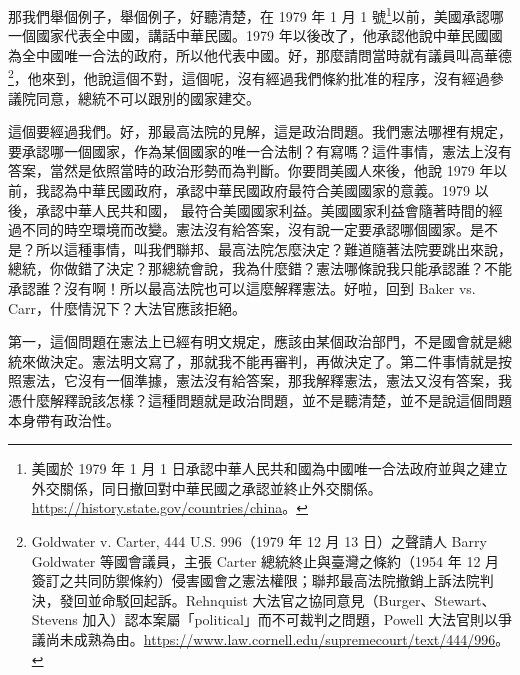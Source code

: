 \hypertarget{c08:cue:38}{}那我們舉個例子，舉個例子，好聽清楚，在 1979 年 1 月 1 號\footnote{美國於 1979 年 1 月 1 日承認中華人民共和國為中國唯一合法政府並與之建立外交關係，同日撤回對中華民國之承認並終止外交關係。\url{https://history.state.gov/countries/china}。}以前，美國承認哪一個國家代表全中國，講話中華民國。1979 年以後改了，他承認他說中華民國國為全中國唯一合法的政府，所以他代表中國。好，那麼請問當時就有議員叫高華德\footnote{Goldwater v. Carter, 444 U.S. 996（1979 年 12 月 13 日）之聲請人 Barry Goldwater 等國會議員，主張 Carter 總統終止與臺灣之條約（1954 年 12 月簽訂之共同防禦條約）侵害國會之憲法權限；聯邦最高法院撤銷上訴法院判決，發回並命駁回起訴。Rehnquist 大法官之協同意見（Burger、Stewart、Stevens 加入）認本案屬「political」而不可裁判之問題，Powell 大法官則以爭議尚未成熟為由。\url{https://www.law.cornell.edu/supremecourt/text/444/996}。}，他來到，他說這個不對，這個呢，沒有經過我們條約批准的程序，沒有經過參議院同意，總統不可以跟別的國家建交。

\hypertarget{c08:cue:39}{}這個要經過我們。好，那最高法院的見解，這是政治問題。我們憲法哪裡有規定，要承認哪一個國家，作為某個國家的唯一合法制？有寫嗎？這件事情，憲法上沒有答案，當然是依照當時的政治形勢而為判斷。你要問美國人來後，他說 1979 年以前，我認為中華民國政府，承認中華民國政府最符合美國國家的意義。1979 以後，承認中華人民共和國，
\hypertarget{c08:cue:40}{}最符合美國國家利益。美國國家利益會隨著時間的經過不同的時空環境而改變。憲法沒有給答案，沒有說一定要承認哪個國家。是不是？所以這種事情，叫我們聯邦、最高法院怎麼決定？難道隨著法院要跳出來說，總統，你做錯了決定？那總統會說，我為什麼錯？憲法哪條說我只能承認誰？不能承認誰？沒有啊！所以最高法院也可以這麼解釋憲法。好啦，回到 Baker vs. Carr，什麼情況下？大法官應該拒絕。

\hypertarget{c08:cue:41}{}第一，這個問題在憲法上已經有明文規定，應該由某個政治部門，不是國會就是總統來做決定。憲法明文寫了，那就我不能再審判，再做決定了。第二件事情就是按照憲法，它沒有一個準據，憲法沒有給答案，那我解釋憲法，憲法又沒有答案，我憑什麼解釋說該怎樣？這種問題就是政治問題，並不是聽清楚，並不是說這個問題本身帶有政治性。

